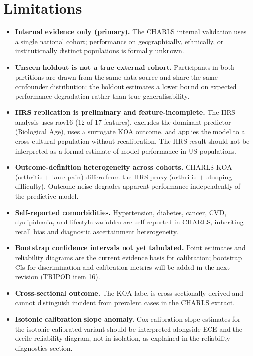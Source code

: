 \documentclass[11pt,a4paper]{article}
\begin{document}
\section{Limitations}
\begin{itemize}

\item \textbf{Internal evidence only (primary).} The CHARLS internal validation uses a single
national cohort; performance on geographically, ethnically, or institutionally distinct populations
is formally unknown.

\item \textbf{Unseen holdout is not a true external cohort.} Participants in both partitions are
drawn from the same data source and share the same confounder distribution; the holdout estimates a
lower bound on expected performance degradation rather than true generalisability.

\item \textbf{HRS replication is preliminary and feature-incomplete.} The HRS analysis uses raw16
(12 of 17 features), excludes the dominant predictor (Biological Age), uses a surrogate KOA
outcome, and applies the model to a cross-cultural population without recalibration. The HRS result
should not be interpreted as a formal estimate of model performance in US populations.

\item \textbf{Outcome-definition heterogeneity across cohorts.} CHARLS KOA (arthritis $+$ knee pain)
differs from the HRS proxy (arthritis $+$ stooping difficulty). Outcome noise degrades apparent
performance independently of the predictive model.

\item \textbf{Self-reported comorbidities.} Hypertension, diabetes, cancer, CVD, dyslipidemia, and
lifestyle variables are self-reported in CHARLS, inheriting recall bias and diagnostic ascertainment
heterogeneity.

\item \textbf{Bootstrap confidence intervals not yet tabulated.} Point estimates and reliability
diagrams are the current evidence basis for calibration; bootstrap CIs for discrimination and
calibration metrics will be added in the next revision (TRIPOD item 16).

\item \textbf{Cross-sectional outcome.} The KOA label is cross-sectionally derived and cannot
distinguish incident from prevalent cases in the CHARLS extract.

\item \textbf{Isotonic calibration slope anomaly.} Cox calibration-slope estimates for the
isotonic-calibrated variant should be interpreted alongside ECE and the decile reliability diagram,
not in isolation, as explained in the reliability-diagnostics section.

\end{itemize}
\end{document}
